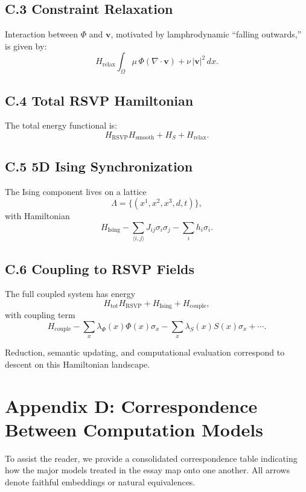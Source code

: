 \documentclass[12pt,letterpaper]{article}
\theoremstyle{remark}
\begin{document}
\subsection*{C.3 Constraint Relaxation}
Interaction between $\Phi$ and $\mathbf{v}$, motivated by lamphrodynamic
``falling outwards,'' is given by:
\[
H_{\text{relax}}
\int_{\Omega}
\mu\,\Phi(\nabla\cdot\mathbf{v})
+ \nu\,|\mathbf{v}|^2
\,dx.
\]

\subsection*{C.4 Total RSVP Hamiltonian}
The total energy functional is:
\[
H_{\text{RSVP}}
H_{\text{smooth}}
+ H_S
+ H_{\text{relax}}.
\]

\subsection*{C.5 5D Ising Synchronization}
The Ising component lives on a lattice
\[
\Lambda = \{(x^1,x^2,x^3,d,t)\},
\]
with Hamiltonian
\[
H_{\text{Ising}}
-\sum_{\langle i,j\rangle} J_{ij}\sigma_i\sigma_j
- \sum_i h_i \sigma_i.
\]

\subsection*{C.6 Coupling to RSVP Fields}
The full coupled system has energy
\[
H_{\text{tot}}
H_{\text{RSVP}}
+ H_{\text{Ising}}
+ H_{\text{couple}},
\]
with coupling term
\[
H_{\text{couple}}
-\sum_{x}\lambda_\Phi(x)\Phi(x)\sigma_x
-\sum_{x}\lambda_S(x)S(x)\sigma_x
+ \cdots.
\]

Reduction, semantic updating, and computational evaluation correspond to
descent on this Hamiltonian landscape.


\section{Appendix D: Correspondence Between Computation Models}

To assist the reader, we provide a consolidated correspondence table indicating
how the major models treated in the essay map onto one another.  
All arrows denote faithful embeddings or natural equivalences.
\end{document}
